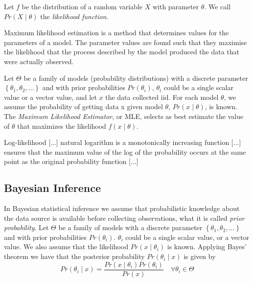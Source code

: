 \begin{definition}
    Let $f$ be the distribution of a random variable $X$ with parameter $\theta$. We call $Pr(X \mid \theta)$ the \emph{likelihood function}.
\end{definition}

{\color{red} Maximum likelihood estimation is a method that determines values for the parameters of a model. The parameter values are found such that they maximise the likelihood that the process described by the model produced the data that were actually observed.}

Let $\Theta$ be a family of models (probability distributions) with a discrete parameter $\left\{ \theta_1,\theta_2,\ldots \right\}$ and with prior probabilities $Pr\left(\theta_i \right)$, $\theta_i$ could be a single scalar value or a vector value, and let $x$ the data collected {\color{red} iid}. For each model $\theta$, we assume the probability of getting data x given model $\theta$, $Pr\left(x\mid\theta\right)$, is known. The \emph{Maximum Likelihood Estimator}, or MLE, selects as best estimate the value of $\theta$ that maximizes the likelihood $f\left(x\mid\theta\right)$.

{\color{red} Log-likelihood [...] natural logarithm is a monotonically increasing function [...] ensures that the maximum value of the log of the probability occurs at the same point as the original probability function [...]}


\subsection{Bayesian Inference}

In Bayesian statistical inference we assume that probabilistic knowledge about the data source is available before collecting observations, what it is called \emph{prior probability}. Let $\Theta$ be a family of models with a discrete parameter $\left\{ \theta_1,\theta_2,\ldots \right\}$ and with prior probabilities $Pr\left(\theta_i \right)$. {\color{red} $\theta_i$ could be a single scalar value, or a vector value.} We also assume that the likelihood $Pr\left(x \mid \theta_i \right)$ is known. Applying Bayes' theorem we have that the posterior probability $Pr\left(\theta_i \mid x\right)$ is given by
\[
    Pr\left(\theta_i \mid x\right) = \frac{Pr\left(x\mid\theta_i\right) Pr\left(\theta_i \right)}{Pr\left(x\right)} \quad \forall \theta_i \in \Theta
\]

